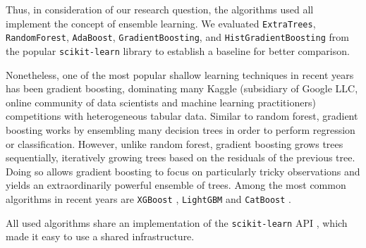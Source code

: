 Thus, in consideration of our research question, the algorithms used all implement the concept of ensemble learning.
We evaluated \texttt{ExtraTrees}, \texttt{RandomForest}, \texttt{AdaBoost}, \texttt{GradientBoosting}, and \texttt{HistGradientBoosting} from the popular \texttt{scikit-learn} library \cite{scikit-learn} to establish a baseline for better comparison.

Nonetheless, one of the most popular shallow learning techniques in recent years has been gradient boosting, dominating many Kaggle (subsidiary of Google LLC, online community of data scientists and machine learning practitioners) competitions with heterogeneous tabular data.
Similar to random forest, gradient boosting works by ensembling many decision trees in order to perform regression or classification.
However, unlike random forest, gradient boosting grows trees sequentially, iteratively growing trees based on the residuals of the previous tree.
Doing so allows gradient boosting to focus on particularly tricky observations and yields an extraordinarily powerful ensemble of trees.
Among the most common algorithms in recent years are \texttt{XGBoost} \cite{DBLP:conf/kdd/ChenG16}, \texttt{LightGBM} \cite{DBLP:conf/nips/KeMFWCMYL17} and \texttt{CatBoost} \cite{DBLP:journals/corr/abs-1810-11363}.

All used algorithms share an implementation of the \texttt{scikit-learn} API \cite{sklearn_api}, which made it easy to use a shared infrastructure.
